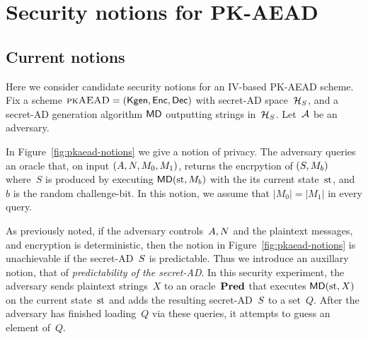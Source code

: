 
\section{Security notions for PK-AEAD} 
\subsection{Current notions}
Here we consider candidate security notions for an IV-based PK-AEAD scheme.  Fix a scheme $\pkaead=(\Kgen,\Enc,\Dec)$ with secret-AD space~$\metadata$, and a secret-AD generation algorithm $\mdalg$ outputting strings in~$\metadata$.  Let~$\advA$ be an adversary.  

In Figure~\ref{fig:pkaead-notions} we give a notion of privacy.  The adversary queries an oracle that, on input $(\header,\pubiv,M_0,M_1)$, returns the encrpytion of $(\seciv,M_b)$ where~$S$ is produced by executing $\mdalg(\st,M_b)$ with the its current state~$\st$, and~$b$ is the random challenge-bit.  In this notion, we assume that $|M_0|=|M_1|$ in every query.

As previously noted, if the adversary controls~$\header, \pubiv$ and the plaintext messages, and encryption is deterministic, then the notion in Figure~\ref{fig:pkaead-notions} is unachievable if the secret-AD~$\seciv$ is predictable. Thus we introduce an auxillary notion, that of \textit{predictability of the secret-AD}.  In this security experiment, the adversary sends plaintext strings~$X$ to an oracle~$\predOracle$ that executes $\mdalg(\st,X)$ on the current state~$\st$ and adds the resulting secret-AD~$\seciv$ to a set~$Q$.  After the adversary has finished loading~$Q$ via these queries, it attempts to guess an element of~$Q$. 




